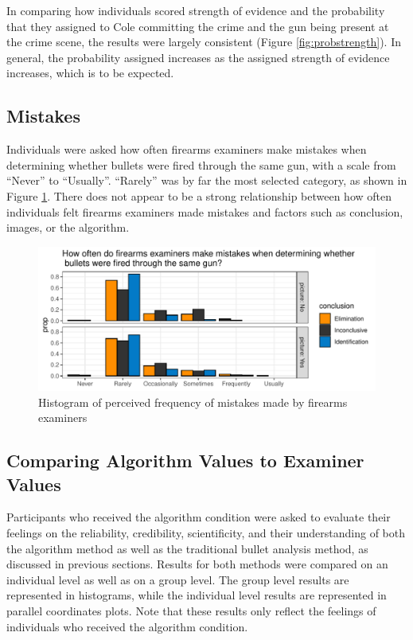 \documentclass[print]{nuthesis}
\begin{document}
In comparing how individuals scored strength of evidence and the probability that they assigned to Cole committing the crime and the gun being present at the crime scene, the results were largely consistent (Figure \ref{fig:probstrength}).
In general, the probability assigned increases as the assigned strength of evidence increases, which is to be expected.

\hypertarget{mistakes}{%
\subsection{Mistakes}\label{mistakes}}

Individuals were asked how often firearms examiners make mistakes when determining whether bullets were fired through the same gun, with a scale from ``Never'' to ``Usually''.
``Rarely'' was by far the most selected category, as shown in Figure \ref{fig:mistakes}.
There does not appear to be a strong relationship between how often individuals felt firearms examiners made mistakes and factors such as conclusion, images, or the algorithm.

\begin{figure}

{\centering \includegraphics[width=\linewidth]{thesis_files/figure-latex/mistakes-1} 

}

\caption{Histogram of perceived frequency of mistakes made by firearms examiners}\label{fig:mistakes}
\end{figure}

\hypertarget{comparing-algorithm-values-to-examiner-values}{%
\subsection{Comparing Algorithm Values to Examiner Values}\label{comparing-algorithm-values-to-examiner-values}}

Participants who received the algorithm condition were asked to evaluate their feelings on the reliability, credibility, scientificity, and their understanding of both the algorithm method as well as the traditional bullet analysis method, as discussed in previous sections.
Results for both methods were compared on an individual level as well as on a group level.
The group level results are represented in histograms, while the individual level results are represented in parallel coordinates plots.
Note that these results only reflect the feelings of individuals who received the algorithm condition.
\end{document}
